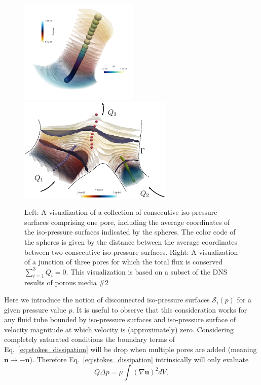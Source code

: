 \documentclass[draft]{agujournal2019}
\begin{document}
\begin{centering}
\begin{figure}[t!]\label{fig:isop_surfaces}
\includegraphics[height=5cm]{figures/example_pore.png}~~~~
\includegraphics[height=5cm]{figures/merging_pores.eps}
\caption{Left: A visualization of a collection of consecutive iso-pressure surfaces comprising one pore, including the average coordinates of the iso-pressure surfaces indicated by the spheres. The color code of the spheres is given by the distance between the average coordinates between two consecutive iso-pressure surfaces. Right: A visualization of a junction of three pores for which the total flux is conserved $\sum_{i=1}^3 Q_i = 0$. This visualization is based on a subset of the DNS results of porous media \#2}
\end{figure}
\end{centering}
Here we introduce the notion of disconnected iso-pressure surfaces $\mathcal{S}_i(p)$ for a given pressure value $p$.
It is useful to observe that this consideration works for any fluid tube bounded by iso-pressure surfaces and iso-pressure surface of velocity magnitude at which velocity is (approximately) zero. Considering completely saturated conditions the boundary terms of Eq.~\ref{eq:stokes_dissipation} will be drop when multiple pores are added (meaning $\mathbf{n}\rightarrow -\mathbf{n}$). Therefore Eq.~\ref{eq:stokes_dissipation} intrinsically will only evaluate
\begin{equation}
Q \Delta p=\mu\int (\nabla \mathbf{u})^2 dV,\label{eq:pore_based_energy_dissipation}
\end{equation}
\end{document}
